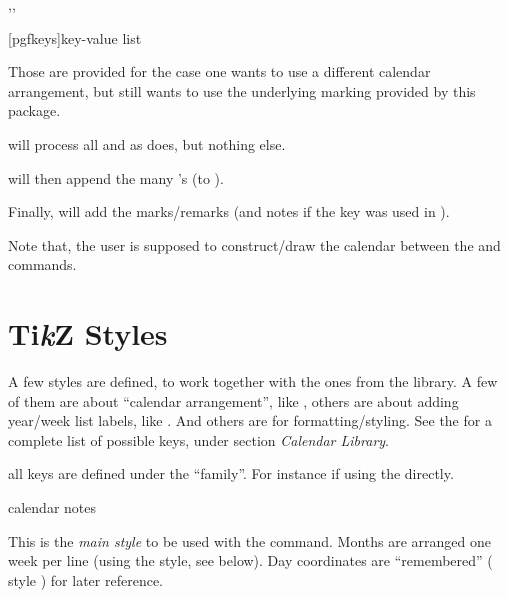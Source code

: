 \documentclass{article}
\begin{document}
\begin{codedescribe}{\calendarnotesprepare,\calendarnotessetifs,\calendarnotesdraw}
\begin{codesyntax}%
\tsmacro{\calendarnotesprepare}[pgfkeys]{key-value list}
\tsmacro{\calendarnotessetifs}{}
\tsmacro{\calendarnotesdraw}{}
\end{codesyntax}
Those are provided for the case one wants to use a different calendar arrangement, but still wants to use the underlying marking provided by this package.

\tsobj{\calendarnotesprepare} will process all  and  as \tsobj{\calendarnotes} does, but nothing else.

\tsobj{\calendarnotessetifs} will then append the many 's (to ).

Finally, \tsobj{\calendarnotesdraw} will add the marks/remarks (and notes if the  key was used in  \tsobj{\calendarnotesprepare}).

Note that, the user is supposed to construct/draw the calendar between the \tsobj{\calendarnotessetifs} and \tsobj{\calendarnotesdraw} commands.
\end{codedescribe}


\section{Ti{\itshape  k}Z Styles}\label{tikz-styles}
A few  styles are defined, to work together with the ones from the  library. A few of them are about ``calendar arrangement'', like , others are about adding year/week list labels, like . And  others are for formatting/styling. See the  \cite{TIKZPGF:3.1} for a complete list of possible keys, under section \emph{Calendar Library}.

\begin{tsremark}
all keys are defined under the  ``family''. For instance  if using the \tsverb{\pgfkeys} directly.
\end{tsremark}



\begin{codedescribe}[key]{calendar notes}
\begin{codesyntax}%
\end{codesyntax}
This is the \emph{main style} to be used with the \tsobj{\calendarnotes} command. Months are arranged one week per line (using the  style, see below). Day coordinates are ``remembered'' ( style ) for later reference.
\end{codedescribe}
\end{document}

